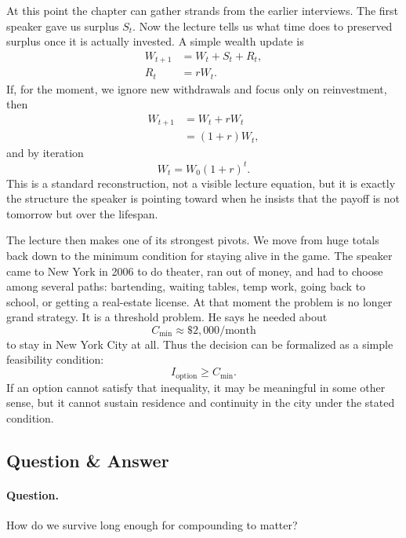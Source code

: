 At this point the chapter can gather strands from the earlier interviews. The first speaker gave us surplus \(S_t\). Now the lecture tells us what time does to preserved surplus once it is actually invested. A simple wealth update is
\begin{align}
W_{t+1} &= W_t + S_t + R_t, \\
R_t &= rW_t.
\end{align}
If, for the moment, we ignore new withdrawals and focus only on reinvestment, then
\begin{align}
W_{t+1} &= W_t + rW_t \\
&= (1+r)W_t,
\end{align}
and by iteration
\begin{equation}
W_t = W_0(1+r)^t.
\end{equation}
This is a standard reconstruction, not a visible lecture equation, but it is exactly the structure the speaker is pointing toward when he insists that the payoff is not tomorrow but over the lifespan.

The lecture then makes one of its strongest pivots. We move from huge totals back down to the minimum condition for staying alive in the game. The speaker came to New York in 2006 to do theater, ran out of money, and had to choose among several paths: bartending, waiting tables, temp work, going back to school, or getting a real-estate license. At that moment the problem is no longer grand strategy. It is a threshold problem. He says he needed about
\begin{equation}
C_{\min} \approx \$2{,}000/\text{month}
\end{equation}
to stay in New York City at all. Thus the decision can be formalized as a simple feasibility condition:
\begin{equation}
I_{\text{option}} \ge C_{\min}.
\end{equation}
If an option cannot satisfy that inequality, it may be meaningful in some other sense, but it cannot sustain residence and continuity in the city under the stated condition.

\subsection{Question \& Answer}

\paragraph{Question.} How do we survive long enough for compounding to matter?

